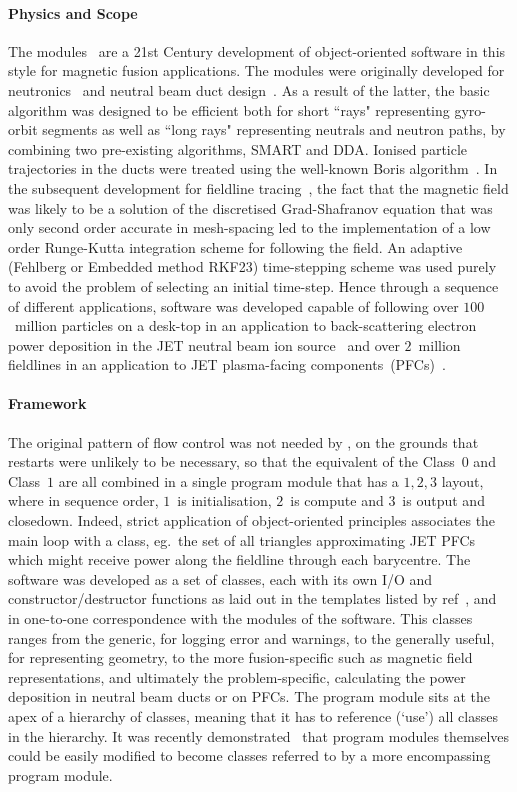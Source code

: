 \paragraph{Physics and Scope}
The  modules~\cite{Wa14b} are a 21st Century development of object-oriented software
in this style for magnetic fusion applications.  The  modules
were originally developed for neutronics~\cite{Wa09a} and neutral beam duct design~\cite{Wa15}.
As a result of the latter, the basic  algorithm was designed to be efficient both for
short ``rays" representing gyro-orbit segments as well as ``long rays" representing
neutrals and neutron paths, by combining two pre-existing algorithms, SMART and DDA.
Ionised particle trajectories in the ducts were treated using the well-known Boris
algorithm~\cite[\S\,4-7]{hockneyeastwood}.
In the subsequent development for fieldline tracing~\cite{Wa14b}, the fact that the magnetic field was likely to 
be a solution of the discretised Grad-Shafranov equation that was only second order accurate in mesh-spacing led to the 
implementation of a low order Runge-Kutta integration scheme for following the field. An adaptive
(Fehlberg or Embedded method RKF23) time-stepping scheme was used purely to avoid the problem of
selecting an initial time-step. Hence through a sequence of different applications,
software was developed capable of following over $100$~million particles on a desk-top in an application 
to back-scattering electron power deposition in the JET neutral beam ion source~\cite{Tu19Ions}
and over $2$~million fieldlines in an application to JET plasma-facing components~(PFCs)~\cite{Wa19}.

\paragraph{Framework}
The original  pattern of flow control was not needed by , 
on the grounds that restarts were unlikely to be necessary, so that the equivalent of
the Class~$0$ and Class~$1$ are all combined in a single program module that has a $1, 2, 3$ layout,
where in sequence order, $1$~is initialisation, $2$~is compute and $3$~is output and closedown.
Indeed, strict application of object-oriented principles associates the main loop with a class,
eg.\ the set of all triangles approximating JET PFCs which might receive power along
the fieldline through each barycentre.
The software was developed as a set of classes, each with its
own I/O and constructor/destructor functions as laid out in the templates
listed by ref~\cite{fprog}, and in one-to-one correspondence with the modules of
the software. This classes ranges from the generic, for logging error and warnings,
to the generally useful, for representing geometry, to the more fusion-specific
such as magnetic field representations, and ultimately the problem-specific, calculating
the power deposition in neutral beam ducts or on PFCs.
The program module sits at the apex of a hierarchy of classes, meaning
that it has to reference (`use') all classes in the hierarchy. It was
recently demonstrated~\cite{Wa19} that program modules themselves could be easily
modified to become classes referred to by a more encompassing program module.

